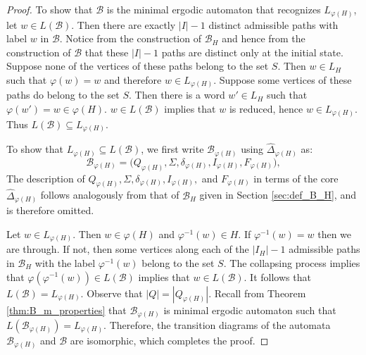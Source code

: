 \documentclass{article}
\newcommand{\B}{\mathcal{B}}
\begin{document}
\begin{proof}
    To show that $\B$ is the minimal ergodic automaton that recognizes $L_{\varphi(H)}$, let $w \in L(\B)$. Then there are exactly $|I|-1$ distinct admissible paths with label $w$ in $\B$. Notice from the construction of $\B_H$ and hence from the construction of $\B$ that these $|I|-1$ paths are distinct only at the initial state. Suppose none of the vertices of these paths belong to the set $S$. Then $w \in L_H$ such that $\varphi(w) = w$ and therefore $w \in L_{\varphi(H)}.$ Suppose some vertices of these paths do belong to the set $S$. Then there is a word $w' \in L_H$ such that $\varphi(w') = w \in \varphi(H)$. $w \in L(\B)$ implies that $w$ is reduced, hence $w \in L_{\varphi(H)}$. Thus $L(\B) \subseteq L_{\varphi(H)}$.
    
    To show that $L_{\varphi(H)} \subseteq L(\B)$, we first write $\B_{\varphi(H)}$ using $\widehat{\Delta}_{\varphi(H)}$ as:
    $$\B_{\varphi(H)} = \bigl(Q_{\varphi(H)}, \Sigma, \delta_{\varphi(H)}, I_{\varphi(H)}, F_{\varphi(H)}\bigr),$$
    The description of $Q_{\varphi(H)}, \Sigma, \delta_{\varphi(H)}, I_{\varphi(H)},$ and $ F_{\varphi(H)}$ in terms of the core $\widehat{\Delta}_{\varphi(H)}$ follows analogously from that of $\B_H$ given in Section \ref{sec:def_B_H}, and is therefore omitted.
    
    Let $w \in L_{\varphi(H)}$. Then $w \in \varphi(H)$ and $\varphi^{-1}(w) \in H$. If $\varphi^{-1}(w) = w$ then we are through. If not, then some vertices along each of the $|I_H| - 1$ admissible paths in $\B_H$ with the label $\varphi^{-1}(w)$ belong to the set $S.$ The collapsing process implies that $\varphi(\varphi^{-1}(w)) \in L(\B)$ implies that $w \in L(\B).$ It follows that $L(\B) = L_{\varphi(H)}$. Observe that $|Q| = |Q_{\varphi(H)}|.$ Recall from Theorem \ref{thm:B_m_properties} that $\B_{\varphi(H)}$ is minimal ergodic automaton such that $L(\B_{\varphi(H)}) = L_{\varphi(H)}.$ Therefore, the transition diagrams of the automata $\B_{\varphi(H)}$ and $\B$ are isomorphic, which completes the proof.
    \end{proof} 
    
\end{document}
